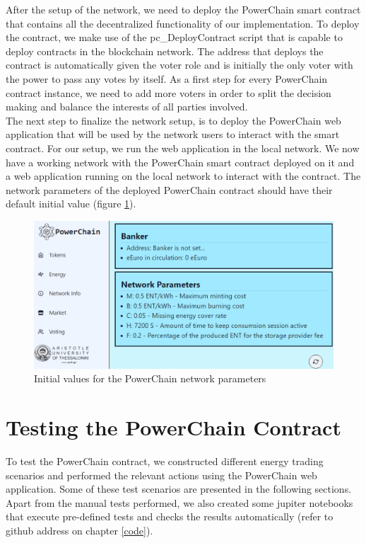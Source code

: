 After the setup of the network, we need to deploy the PowerChain smart contract that contains all the decentralized functionality of our implementation.
To deploy the contract, we make use of the pc\_DeployContract script that is capable to deploy contracts in the blockchain network. The address that deploys the contract
is automatically given the voter role and is initially the only voter with the power to pass any votes by itself. As a first step for every PowerChain contract instance,
we need to add more voters in order to split the decision making and balance the interests of all parties involved. \\
The next step to finalize the network setup, is to deploy the PowerChain web application that will be used by the network users to interact with the smart contract. 
For our setup, we run the web application in the local network. We now have a working network with the PowerChain smart contract deployed on it and a web application running on
the local network to interact with the contract. The network parameters of the deployed PowerChain contract should have their default initial value (figure \ref{fig:initial_network_state}).
\begin{figure}[h!]
    \centering
    \includegraphics[width=\linewidth,frame,scale=1]{Figures/initial_network_state.png}
    \caption{Initial values for the PowerChain network parameters}
    \label{fig:initial_network_state}
\end{figure}


\section{Testing the PowerChain Contract}
To test the PowerChain contract, we constructed different energy trading scenarios and performed the relevant actions using the PowerChain web application.
Some of these test scenarios are presented in the following sections. Apart from the manual tests performed, we also created some jupiter notebooks that execute
pre-defined tests and checks the results automatically (refer to github address on chapter \ref{code}).

